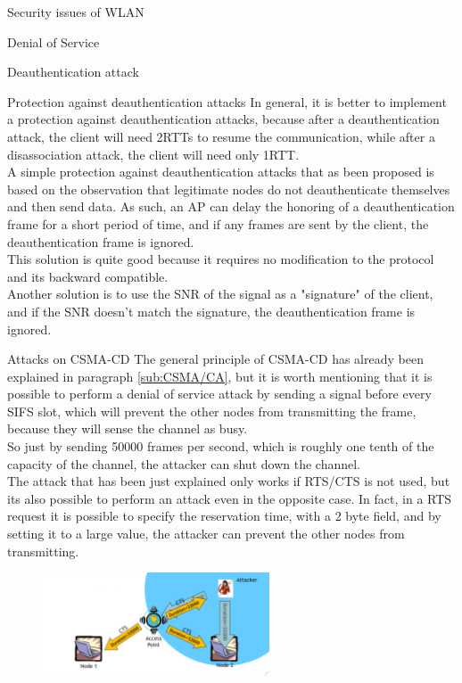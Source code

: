 \begin{section}{Security issues of WLAN}
\begin{subsection}{Denial of Service}
\begin{subsubsection}{Deauthentication attack}
    \end{subsubsection}
    \begin{subsubsection}{Protection against deauthentication attacks}
      In general, it is better to implement a protection against deauthentication attacks, because 
      after a deauthentication attack, the client will need 2RTTs to resume the communication,
      while after a disassociation attack, the client will need only 1RTT.\\
      A simple protection against deauthentication attacks that as been proposed is based on the 
      observation that legitimate nodes do not deauthenticate themselves and then send data.
      As such, an AP can delay the honoring of a deauthentication frame for a short period of time,
      and if any frames are sent by the client, the deauthentication frame is ignored.\\
      This solution is quite good because it requires no modification to the protocol and its 
      backward compatible.\\
      Another solution is to use the SNR of the signal as a "signature" of the client, and if the
      SNR doesn't match the signature, the deauthentication frame is ignored.
    \end{subsubsection}
    \begin{subsubsection}{Attacks on CSMA-CD}
      The general principle of CSMA-CD has already been explained in paragraph \ref{sub:CSMA/CA},
      but it is worth mentioning that it is possible to perform a denial of service attack by
      sending a signal before every SIFS slot, which will prevent the other nodes from transmitting
      the frame, because they will sense the channel as busy.\\
      So just by sending 50000 frames per second, which is roughly one tenth of the capacity of the
      channel, the attacker can shut down the channel.\\
      The attack that has been just explained only works if RTS/CTS is not used, but its also possible
      to perform an attack even in the opposite case. In fact, in a RTS request it is possible to 
      specify the reservation time, with a 2 byte field, and by setting it to a large value,
      the attacker can prevent the other nodes from transmitting. 
      \begin{figure}[h]
        \centering
        \includegraphics[width=0.6\textwidth]{img/wireless/RTS attack.png}

\end{figure}
\end{subsubsection}
\end{subsection}
\end{section}
